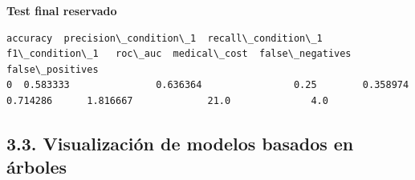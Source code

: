 \documentclass[11pt]{article}
\begin{document}
    
    \textbf{Test final reservado}

    
    
    \begin{Verbatim}[commandchars=\\\{\}]
   accuracy  precision\_condition\_1  recall\_condition\_1  f1\_condition\_1   roc\_auc  medical\_cost  false\_negatives  false\_positives
0  0.583333               0.636364                0.25        0.358974  0.714286      1.816667             21.0              4.0
    \end{Verbatim}

    
    \subsection{3.3. Visualización de modelos basados en
árboles}\label{visualizaciuxf3n-de-modelos-basados-en-uxe1rboles}
\end{document}
